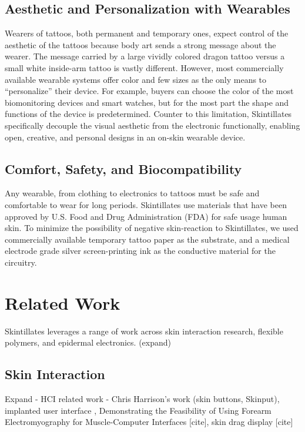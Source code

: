 \documentclass{sigchi}
\begin{document}
\subsection{Aesthetic and Personalization with Wearables}
Wearers of tattoos, both permanent and temporary ones, expect control of the aesthetic of the tattoos because body art sends a strong message about the wearer\cite{Doss:2009ee,McLeod:2014ua}. The message carried by a large vividly colored dragon tattoo versus a small white inside-arm tattoo is vastly different. However, most commercially available wearable systems offer color and few sizes as the only means to “personalize” their device. For example, buyers can choose the color of the most biomonitoring devices and smart watches, but for the most part the shape and functions of the device is predetermined. Counter to this limitation, Skintillates specifically decouple the visual aesthetic from the electronic functionally, enabling open, creative, and personal designs in an on-skin wearable device.

\subsection{Comfort, Safety, and Biocompatibility}
Any wearable, from clothing to electronics to tattoos must be safe and comfortable to wear for long periods.  Skintillates use materials that have been approved by U.S. Food and Drug Administration (FDA) for safe usage human skin. To minimize the possibility of negative skin-reaction to Skintillates, we used commercially available temporary tattoo paper as the substrate, and a medical electrode grade silver screen-printing ink as the conductive material for the circuitry\cite{Anonymous:6vWXbuD5}. 

\section{Related Work}
Skintillates leverages a range of work across skin interaction research, flexible polymers, and epidermal electronics. (expand)
\subsection{Skin Interaction}
Expand - HCI related work - Chris Harrison's work (skin buttons, Skinput\cite{ChrisHarrison:2010vi,Laput:2014du}), implanted user interface \cite{Holz:2012ti}, Demonstrating the Feasibility of Using Forearm Electromyography for Muscle-Computer Interfaces [cite], skin drag display [cite]
\end{document}
